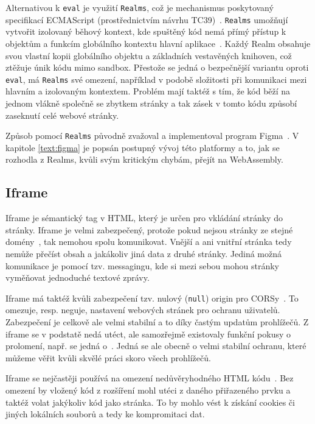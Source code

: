 Alternativou k \texttt{eval} je využití \texttt{Realms}, což je mechanismus poskytovaný specifikací ECMAScript (prostřednictvím návrhu TC39)~\cite{shadowrealms_propsal}. 
\texttt{Realms} umožňují vytvořit izolovaný běhový kontext, kde spuštěný kód nemá přímý přístup k objektům a funkcím globálního kontextu hlavní aplikace~\cite{shadowrealms_propsal, shadowrealms}.
Každý Realm obsahuje svou vlastní kopii globálního objektu a základních vestavěných knihoven, což ztěžuje únik kódu mimo sandbox.
Přestože se jedná o bezpečnější variantu oproti \texttt{eval}, má \texttt{Realms} své omezení, například v podobě složitosti při komunikaci mezi hlavním a izolovaným kontextem. 
Problém mají taktéž s tím, že kód běží na jednom vlákně společně se zbytkem stránky a tak zásek v tomto kódu způsobí zaseknutí celé webové stránky.

Způsob pomocí \texttt{Realms} původně zvažoval a implementoval program Figma~\cite{figma_plugins_blog}.
V kapitole \ref{text:figma} je popsán postupný vývoj této platformy a to, jak se rozhodla z Realms, kvůli svým kritickým chybám, přejít na WebAssembly.

\subsection{Iframe}

Iframe je sémantický tag v HTML, který je určen pro vkládání stránky do stránky.
Iframe je velmi zabezpečený, protože pokud nejsou stránky ze stejné domény~\cite{iframe, figma_plugins_blog}, tak nemohou spolu komunikovat.
Vnější a ani vnitřní stránka tedy nemůže přečíst obsah a jakákoliv jiná data z druhé stránky.
Jediná možná komunikace je pomocí tzv. messagingu, kde si mezi sebou mohou stránky vyměňovat jednoduché textové zprávy.

Iframe má taktéž kvůli zabezpečení tzv. nulový (\texttt{null}) origin pro CORSy~\cite{iframe, figma_plugins_blog}.
To omezuje, resp. neguje, nastavení webových stránek pro ochranu uživatelů.
Zabezpečení je celkově ale velmi stabilní a to díky častým updatům prohlížečů.
Z iframe se v podstatě nedá utéct, ale samozřejmě existovaly funkční pokusy o prolomení, např. se jedná o~\cite{iframe_vuln}.
Jedná se ale obecně o velmi stabilní ochranu, které můžeme věřit kvůli skvělé práci skoro všech prohlížečů.

Iframe se nejčastěji používá na omezení nedůvěryhodného HTML kódu~\cite{iframe}.
Bez omezení by vložený kód z rozšíření mohl utéci z daného přiřazeného prvku a taktéž volat jakýkoliv kód jako stránka.
To by mohlo vést k získání cookies či jiných lokálních souborů a tedy ke kompromitaci dat.

